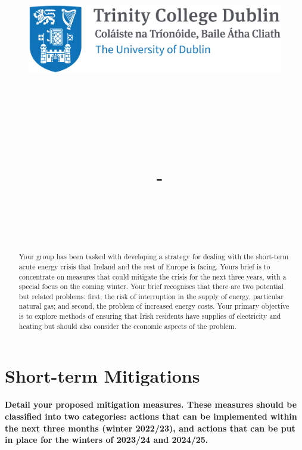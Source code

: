 \documentclass{article}
\title{
    \vspace{-1in}
    \begin{figure}[!ht]
    \flushleft
    \includegraphics[width=0.4\linewidth]{reduced-trinity.png}
    \end{figure}
    \vspace{-0.5cm}
    \hrulefill \\
    \vspace{1cm}
    \textmd{\textbf{\moduleCode\ \moduleName}}\\
    \textmd{\textbf{\assignmentTitle}}\\
    \textmd{\authorName\ - \authorID}\\
    \textmd{\reportDate}\\
    \vspace{0.5cm}
    \hrulefill \\
}
\date{}
\author{}
\begin{document}
    \lstset{language=bash, float=h, captionpos=b, frame=single, numbers=left, numberblanklines=false, numberstyle=\tiny, numbersep=1mm, framexleftmargin=3mm, xleftmargin=5mm, aboveskip=3mm, breaklines=true}
    \captionsetup{width=.8\linewidth} 

    \maketitle
    \begin{abstract}
        Your group has been tasked with developing a strategy for dealing with the short-term acute energy crisis that Ireland and the rest of Europe is facing. Yours brief is to concentrate on measures that could mitigate the crisis for the next three years, with a special focus on the coming winter. Your brief recognises that there are two potential but related problems: first, the risk of interruption in the supply of energy, particular natural gas; and second, the problem of increased energy costs. Your primary objective is to explore methods of ensuring that Irish residents have supplies of electricity and heating but should also consider the economic aspects of the problem. 
    \end{abstract}
    \newpage

    \section{Short-term Mitigations}
    {\scriptsize\textbf{Detail your proposed mitigation measures. These measures should be classified into two categories: actions that can be implemented within the next three months (winter 2022/23), and actions that can be put in place for the winters of 2023/24 and 2024/25.}}
    \vspace{10pt}
\end{document}
